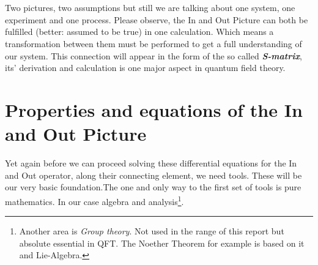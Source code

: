 \documentclass[12pt, titlepage]{article}
\begin{document}
\\\\
Two pictures, two assumptions but still we are talking about one system, one experiment and one process. Please observe, the In and Out Picture can both be fulfilled (better: assumed to be true) in one calculation. Which means a transformation between them must be performed to get a full understanding of our system.
This connection will appear in the form of the so called \textit{\textbf{S-matrix}}, its' derivation and calculation is one major aspect in quantum field theory. 

\section{Properties and equations of the In and Out Picture}
Yet again before we can proceed solving these differential equations for the In and Out operator, along their connecting element, we need tools. These will be our very basic foundation.The one and only way to the first set of tools is pure mathematics. In our case algebra and analysis\footnote{Another area is \emph{Group theory}. Not used in the range of this report but absolute essential in QFT. The Noether Theorem for example is based on it and Lie-Algebra.}.
%
\end{document}
